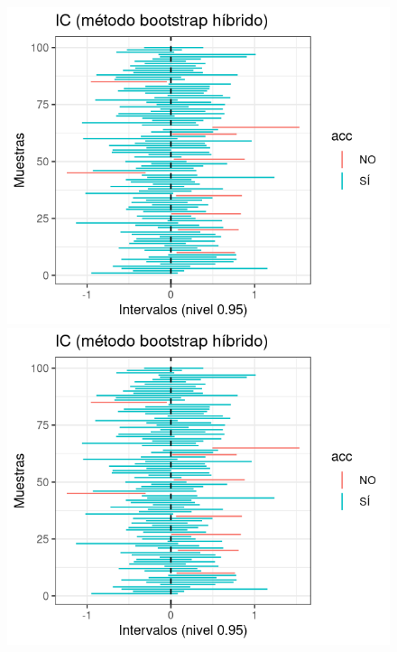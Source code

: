 \documentclass[a4paper]{article}
\begin{document}
   \begin{figure}[!htb]
  \includegraphics[width=\linewidth]{media/norm-hybrid.png}
\endminipage\hfill
{}
  \includegraphics[width=\linewidth]{media/norm-hybrid.png}
\endminipage\hfill
{}%

\end{figure}
\end{document}
